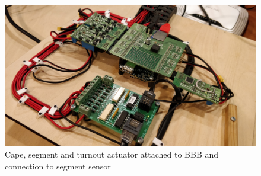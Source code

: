 \begin{figure}[!h]
	\centering
	\includegraphics[width=150mm]{figures/modes3/segmentControlling.jpg}
	\caption{Cape, segment and turnout actuator attached to BBB and connection to segment sensor}
	\label{fig:BBBinAll}
\end{figure}
%
%
%

